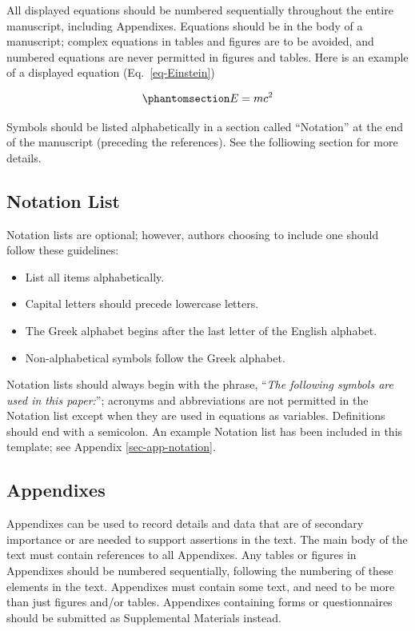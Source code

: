 \documentclass[NewProceedings, InsideFigs,LineNumbers]{asce-quarto}
\begin{document}
All displayed equations should be numbered sequentially throughout the
entire manuscript, including Appendixes. Equations should be in the body
of a manuscript; complex equations in tables and figures are to be
avoided, and numbered equations are never permitted in figures and
tables. Here is an example of a displayed equation
(Eq.~\ref{eq-Einstein})

\begin{equation}\phantomsection\label{eq-Einstein}{
E = m c^{2}
}\end{equation}

Symbols should be listed alphabetically in a section called ``Notation''
at the end of the manuscript (preceding the references). See the
folliowing section for more details.

\subsection{Notation List}\label{notation-list}

Notation lists are optional; however, authors choosing to include one
should follow these guidelines:

\begin{itemize}
\item
  List all items alphabetically.
\item
  Capital letters should precede lowercase letters.
\item
  The Greek alphabet begins after the last letter of the English
  alphabet.
\item
  Non-alphabetical symbols follow the Greek alphabet.
\end{itemize}

Notation lists should always begin with the phrase, ``\emph{The
following symbols are used in this paper:}''; acronyms and abbreviations
are not permitted in the Notation list except when they are used in
equations as variables. Definitions should end with a semicolon. An
example Notation list has been included in this template; see Appendix
\ref{sec-app-notation}.

\subsection{Appendixes}\label{appendixes}

Appendixes can be used to record details and data that are of secondary
importance or are needed to support assertions in the text. The main
body of the text must contain references to all Appendixes. Any tables
or figures in Appendixes should be numbered sequentially, following the
numbering of these elements in the text. Appendixes must contain some
text, and need to be more than just figures and/or tables. Appendixes
containing forms or questionnaires should be submitted as Supplemental
Materials instead.
\end{document}
